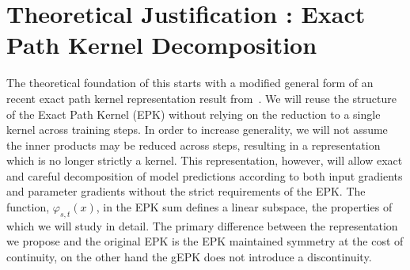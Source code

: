 \section{Theoretical Justification : Exact Path Kernel Decomposition}
\label{sec:gepk}
The theoretical foundation of this starts with a modified general form of an recent exact path kernel representation result from~\citet{bell2023}.
We will reuse the structure of the Exact Path Kernel (EPK) without relying on the reduction to a single kernel across training steps.
In order to increase generality, we will not assume the inner products may be reduced across steps, resulting in a representation which is no longer strictly a kernel.
This representation, however, will allow exact and careful decomposition of model predictions according to both input gradients and parameter gradients without the strict requirements of the EPK.
The function, $\varphi_{s,t}(x)$, in the EPK sum defines a linear subspace, the properties of which we will study in detail.
The primary difference between the representation we propose and the original EPK is the EPK maintained symmetry at the cost of continuity, on the other hand the gEPK does not introduce a discontinuity.

